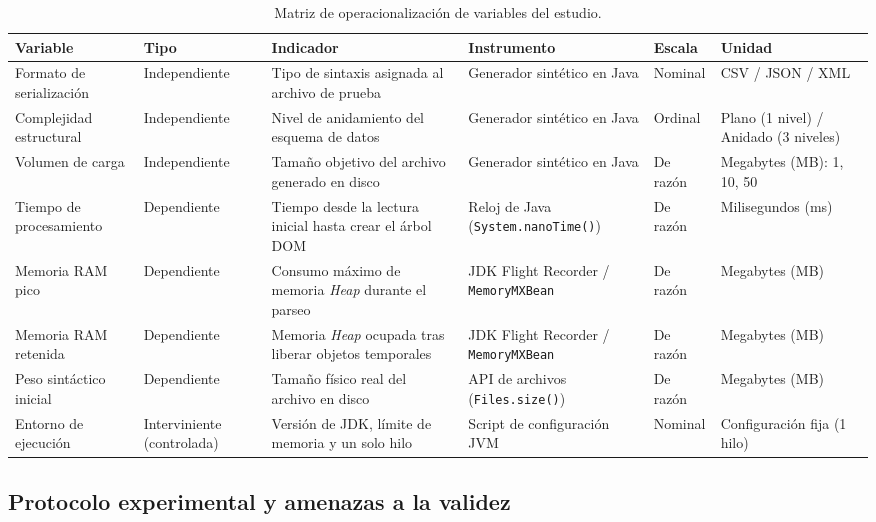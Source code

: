 \begin{table}[htbp]
\centering
\caption{Matriz de operacionalización de variables del estudio.}
\label{tab:operacionalizacion}
\footnotesize
\begin{tabularx}{\textwidth}{>{\raggedright\arraybackslash}p{2.2cm} >{\raggedright\arraybackslash}p{1.8cm} >{\raggedright\arraybackslash}X >{\raggedright\arraybackslash}p{2.4cm} >{\raggedright\arraybackslash}p{1.5cm} >{\raggedright\arraybackslash}p{2.0cm}}
\toprule
\textbf{Variable} & \textbf{Tipo} & \textbf{Indicador} & \textbf{Instrumento} & \textbf{Escala} & \textbf{Unidad} \\
\midrule
Formato de serialización & Independiente & Tipo de sintaxis asignada al archivo de prueba & Generador sintético en Java & Nominal & CSV / JSON / XML \\
\midrule
Complejidad estructural & Independiente & Nivel de anidamiento del esquema de datos & Generador sintético en Java & Ordinal & Plano (1 nivel) / Anidado (3 niveles) \\
\midrule
Volumen de carga & Independiente & Tamaño objetivo del archivo generado en disco & Generador sintético en Java & De razón & Megabytes (MB): 1, 10, 50 \\
\midrule
Tiempo de procesamiento & Dependiente & Tiempo desde la lectura inicial hasta crear el árbol DOM & Reloj de Java (\texttt{System.nanoTime()}) & De razón & Milisegundos (ms) \\
\midrule
Memoria RAM pico & Dependiente & Consumo máximo de memoria \textit{Heap} durante el parseo & JDK Flight Recorder / \texttt{MemoryMXBean} & De razón & Megabytes (MB) \\
\midrule
Memoria RAM retenida & Dependiente & Memoria \textit{Heap} ocupada tras liberar objetos temporales & JDK Flight Recorder / \texttt{MemoryMXBean} & De razón & Megabytes (MB) \\
\midrule
Peso sintáctico inicial & Dependiente & Tamaño físico real del archivo en disco & API de archivos (\texttt{Files.size()}) & De razón & Megabytes (MB) \\
\midrule
Entorno de ejecución & Interviniente (controlada) & Versión de JDK, límite de memoria y un solo hilo & Script de configuración JVM & Nominal & Configuración fija (1 hilo) \\
\bottomrule
\end{tabularx}
\end{table}

\subsection{Protocolo experimental y amenazas a la validez}


